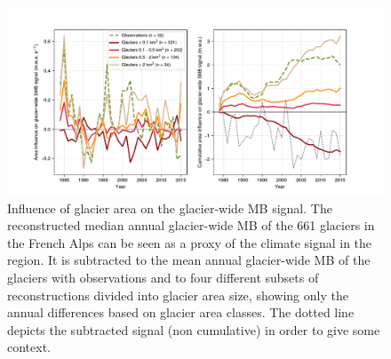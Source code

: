 {\begin{figure}[h]
\centering
\includegraphics[width=16cm]{Figures/past/Figure_S3.pdf}
\captionsetup{justification=centering}
\caption{Influence of glacier area on the glacier-wide MB signal. The reconstructed median annual glacier-wide MB of the 661 glaciers in the French Alps can be seen as a proxy of the climate signal in the region. It is subtracted to the mean annual glacier-wide MB of the glaciers with observations and to four different subsets of reconstructions divided into glacier area size, showing only the annual differences based on glacier area classes. The dotted line depicts the subtracted signal (non cumulative) in order to give some context.}
\label{past:figS3}
\end{figure}

}
